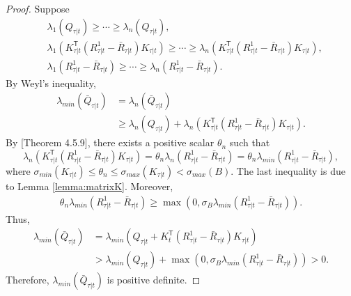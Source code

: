 \documentclass{article}
\newcommand{\transpose}{\mathsf{T}}
\begin{document}
\begin{proof}
    Suppose
    \begin{align*}
        &\lambda_{1}(Q_{\tau|t}) \geq \cdots \geq \lambda_{n}(Q_{\tau|t}),\\
        &\lambda_{1}(K_{\tau|t}^{\transpose}(R_{\tau|t}^{1} - \bar{R}_{\tau|t})K_{\tau|t}) \geq \cdots \geq \lambda_{n}(K_{\tau|t}^{\transpose}(R_{\tau|t}^{1} - \bar{R}_{\tau|t})K_{\tau|t}),\\
        &\lambda_{1}(R_{\tau|t}^{1} - \bar{R}_{\tau|t}) \geq \cdots \geq \lambda_{n}(R_{\tau|t}^{1} - \bar{R}_{\tau|t}).
    \end{align*}
    By Weyl's inequality,
    \begin{align*}
        \lambda_{min}(\bar{Q}_{\tau|t}) &= \lambda_{n}(\bar{Q}_{\tau|t})\\
        &\geq \lambda_{n}(Q_{\tau|t}) + \lambda_{n}(K_{\tau|t}^{\transpose}(R_{\tau|t}^{1} - \bar{R}_{\tau|t})K_{\tau|t}).
    \end{align*}
    By \cite{}[Theorem 4.5.9], there exists a positive scalar $\theta_{n}$ such that
    \begin{equation}
        \lambda_{n}(K_{\tau|t}^{\transpose}(R_{\tau|t}^{1} - \bar{R}_{\tau|t})K_{\tau|t}) = \theta_{n}\lambda_{n}(R_{\tau|t}^{1} - \bar{R}_{\tau|t}) = \theta_{n}\lambda_{min}(R_{\tau|t}^{1} - \bar{R}_{\tau|t}),
    \end{equation}
    where $\sigma_{min}(K_{\tau|t}) \leq \theta_{n} \leq \sigma_{max}(K_{\tau|t}) < \sigma_{max}(B)$.
    The last inequality is due to Lemma \ref{lemma:matrixK}. Moreover,
    \begin{align*}
        \theta_{n}\lambda_{min}(R_{\tau|t}^{1} - \bar{R}_{\tau|t}) \geq \max(0,\sigma_{B}\lambda_{min}(R_{\tau|t}^{1} - \bar{R}_{\tau|t})).
    \end{align*}
    Thus, 
    \begin{align*}
        \lambda_{min}(\bar{Q}_{\tau|t}) &= \lambda_{min}(Q_{\tau|t}+K_{t}^{\transpose}(R_{\tau|t}^{1}-\bar{R}_{\tau|t})K_{\tau|t}) \\
        &> \lambda_{min}(Q_{\tau|t}) +\max(0,\sigma_{B}\lambda_{min}(R_{\tau|t}^{1} - \bar{R}_{\tau|t})) > 0.
    \end{align*}
    Therefore, $\lambda_{min}(\bar{Q}_{\tau|t})$ is positive definite.
\end{proof}
\end{document}
